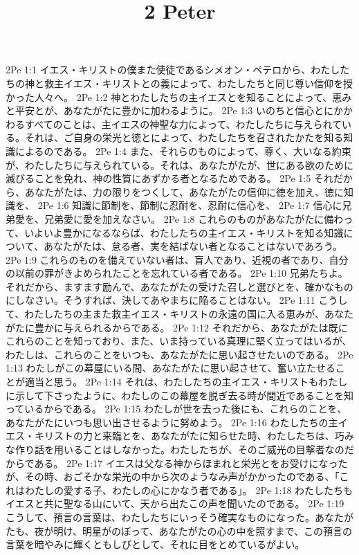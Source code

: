 

\title{2 Peter}

2Pe 1:1  イエス・キリストの僕また使徒であるシメオン・ペテロから、わたしたちの神と救主イエス・キリストとの義によって、わたしたちと同じ尊い信仰を授かった人々へ。
2Pe 1:2  神とわたしたちの主イエスとを知ることによって、恵みと平安とが、あなたがたに豊かに加わるように。
2Pe 1:3  いのちと信心とにかかわるすべてのことは、主イエスの神聖な力によって、わたしたちに与えられている。それは、ご自身の栄光と徳とによって、わたしたちを召されたかたを知る知識によるのである。
2Pe 1:4  また、それらのものによって、尊く、大いなる約束が、わたしたちに与えられている。それは、あなたがたが、世にある欲のために滅びることを免れ、神の性質にあずかる者となるためである。
2Pe 1:5  それだから、あなたがたは、力の限りをつくして、あなたがたの信仰に徳を加え、徳に知識を、
2Pe 1:6  知識に節制を、節制に忍耐を、忍耐に信心を、
2Pe 1:7  信心に兄弟愛を、兄弟愛に愛を加えなさい。
2Pe 1:8  これらのものがあなたがたに備わって、いよいよ豊かになるならば、わたしたちの主イエス・キリストを知る知識について、あなたがたは、怠る者、実を結ばない者となることはないであろう。
2Pe 1:9  これらのものを備えていない者は、盲人であり、近視の者であり、自分の以前の罪がきよめられたことを忘れている者である。
2Pe 1:10  兄弟たちよ。それだから、ますます励んで、あなたがたの受けた召しと選びとを、確かなものにしなさい。そうすれば、決してあやまちに陥ることはない。
2Pe 1:11  こうして、わたしたちの主また救主イエス・キリストの永遠の国に入る恵みが、あなたがたに豊かに与えられるからである。
2Pe 1:12  それだから、あなたがたは既にこれらのことを知っており、また、いま持っている真理に堅く立ってはいるが、わたしは、これらのことをいつも、あなたがたに思い起させたいのである。
2Pe 1:13  わたしがこの幕屋にいる間、あなたがたに思い起させて、奮い立たせることが適当と思う。
2Pe 1:14  それは、わたしたちの主イエス・キリストもわたしに示して下さったように、わたしのこの幕屋を脱ぎ去る時が間近であることを知っているからである。
2Pe 1:15  わたしが世を去った後にも、これらのことを、あなたがたにいつも思い出させるように努めよう。
2Pe 1:16  わたしたちの主イエス・キリストの力と来臨とを、あなたがたに知らせた時、わたしたちは、巧みな作り話を用いることはしなかった。わたしたちが、そのご威光の目撃者なのだからである。
2Pe 1:17  イエスは父なる神からほまれと栄光とをお受けになったが、その時、おごそかな栄光の中から次のようなみ声がかかったのである、「これはわたしの愛する子、わたしの心にかなう者である」。
2Pe 1:18  わたしたちもイエスと共に聖なる山にいて、天から出たこの声を聞いたのである。
2Pe 1:19  こうして、預言の言葉は、わたしたちにいっそう確実なものになった。あなたがたも、夜が明け、明星がのぼって、あなたがたの心の中を照すまで、この預言の言葉を暗やみに輝くともしびとして、それに目をとめているがよい。
